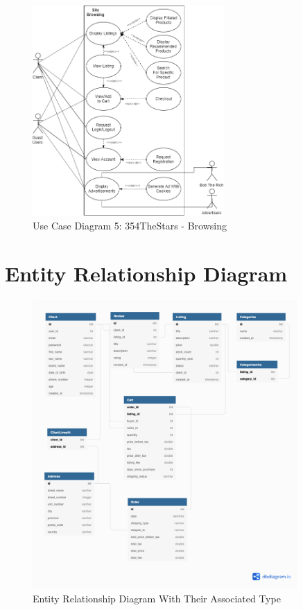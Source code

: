 \documentclass[11pt]{article}
\begin{document}
\begin{figure}[htbp]
    \centering
    \includegraphics[width=0.65\textwidth]{Diagrams/Use_Case/ucd4.png}
    \caption{Use Case Diagram 5: 354TheStars - Browsing }
    \label{fig:ucd5}
\end{figure}


\clearpage
\section{Entity Relationship Diagram}
\begin{figure}[ht!]
    \centering
    \includegraphics[width=0.9\textwidth]{Diagrams/ER/ER_Diagram_Typed.png} %
    \caption{Entity Relationship Diagram With Their Associated Type}
    \label{fig:ER_Typed}
\end{figure}
\end{document}
